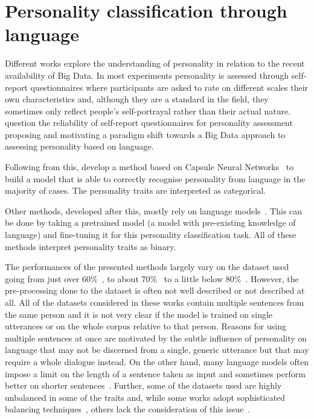 \documentclass[nomenclature, english, biblatex]{kththesis}
\begin{document}
\section{Personality classification through language}
Different works explore the understanding of personality in relation to the recent availability of Big Data. In most experiments personality is assessed through self-report questionnaires where participants are asked to rate on different scales their own characteristics and, although they are a standard in the field, they sometimes only reflect people's self-portrayal rather than their actual nature. \textcite{boyd2017language} question the reliability of self-report questionnaires for personality assessment proposing and motivating a paradigm shift towards a Big Data approach to assessing personality based on language. 

Following from this, \textcite{rissola2019personality} develop a method based on Capsule Neural Networks~\cite{hinton2011transforming} to build a model that is able to correctly recognise personality from language in the majority of cases. The personality traits are interpreted as categorical.

Other methods, developed after this, mostly rely on language models~\cite{lucky2021towards, jun2021personality, mehta2020bottom}. This can be done by taking a pretrained model (a model with pre-existing knowledge of language) and fine-tuning it for this personality classification task. All of these methods interpret personality traits as binary.

The performances of the presented methods largely vary on the dataset used going from just over 60\%~\cite{mehta2020bottom}, to about 70\%~\cite{lucky2021towards} to a little below 80\%~\cite{jun2021personality, mehta2020bottom}. However, the pre-processing done to the dataset is often not well described or not described at all. All of the datasets considered in these works contain multiple sentences from the same person and it is not very clear if the model is trained on single utterances or on the whole corpus relative to that person. Reasons for using multiple sentences at once are motivated by the subtle influence of personality on language that may not be discerned from a single, generic utterance but that may require a whole dialogue instead. On the other hand, many language models often impose a limit on the length of a sentence taken as input and sometimes perform better on shorter sentences~\cite{yang2018unsupervised}. Further, some of the datasets used are highly unbalanced in some of the traits and, while some works adopt sophisticated balancing techniques~\cite{lucky2021towards}, others lack the consideration of this issue~\cite{mehta2020bottom}. 
\end{document}
